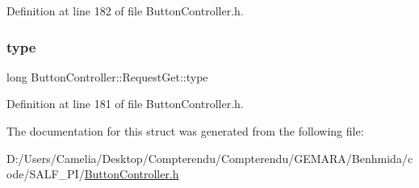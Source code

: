 Definition at line 182 of file Button\+Controller.\+h.

\mbox{\label{struct_button_controller_1_1_request_get_a7eb93a1564fcd3b26017e05dea128bc1}} 
\subsubsection{\texorpdfstring{type}{type}}
{\footnotesize\ttfamily long Button\+Controller\+::\+Request\+Get\+::type}



Definition at line 181 of file Button\+Controller.\+h.



The documentation for this struct was generated from the following file\+:\begin{DoxyCompactItemize}
\item 
D\+:/\+Users/\+Camelia/\+Desktop/\+Compterendu/\+Compterendu/\+G\+E\+M\+A\+R\+A/\+Benhmida/code/\+S\+A\+L\+F\+\_\+\+P\+I/\hyperlink{_button_controller_8h}{Button\+Controller.\+h}\end{DoxyCompactItemize}
